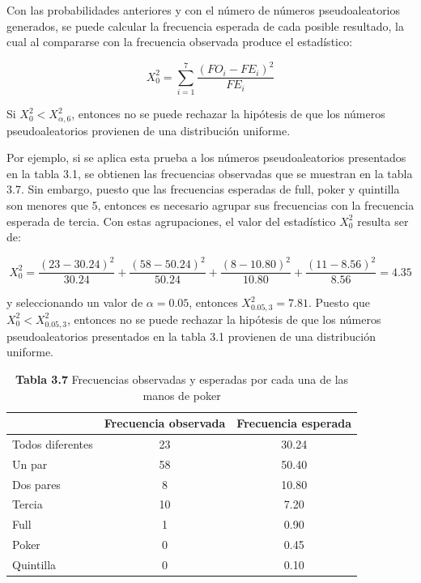 \documentclass[11pt,letterpaper]{report}
\begin{document}
Con las probabilidades anteriores y con el número de números
pseudoaleatorios generados, se puede calcular la frecuencia esperada de
cada posible resultado, la cual al compararse con la frecuencia
observada produce el estadístico:

\begin{equation}
X_0^2 = \sum_{i=1}^{7} \frac{(FO_i - FE_i)^2}{FE_i}
\end{equation}

Si $X_0^2 < X^2_{\alpha,6}$, entonces no se puede rechazar la hipótesis
de que los números pseudoaleatorios provienen de una distribución
uniforme.

Por ejemplo, si se aplica esta prueba a los números pseudoaleatorios
presentados en la tabla 3.1, se obtienen las frecuencias observadas que
se muestran en la tabla 3.7. Sin embargo, puesto que las frecuencias
esperadas de full, poker y quintilla son menores que 5, entonces es
necesario agrupar sus frecuencias con la frecuencia esperada de tercia.
Con estas agrupaciones, el valor del estadístico $X_0^2$ resulta ser de:

\begin{equation}
X_0^2 = \frac{(23-30.24)^2}{30.24} + \frac{(58-50.24)^2}{50.24} +
\frac{(8-10.80)^2}{10.80} + \frac{(11-8.56)^2}{8.56} = 4.35
\end{equation}

y seleccionando un valor de $\alpha=0.05$, entonces $X^2_{0.05,3} =
7.81$. Puesto que $X_0^2 < X^2_{0.05,3}$, entonces no se puede rechazar
la hipótesis de que los números pseudoaleatorios presentados en la
tabla 3.1 provienen de una distribución uniforme.

\begin{table}[H]
\centering
\caption*{\textbf{Tabla 3.7} Frecuencias observadas y esperadas por cada una de las manos de poker}
\begin{tabular}{lcc}
\toprule
 & Frecuencia observada & Frecuencia esperada \\
\midrule
Todos diferentes & 23 & 30.24 \\
Un par & 58 & 50.40 \\
Dos pares & 8 & 10.80 \\
Tercia & 10 & 7.20 \\
Full & 1 & 0.90 \\
Poker & 0 & 0.45 \\
Quintilla & 0 & 0.10 \\
\bottomrule
\end{tabular}
\end{table}
\end{document}
